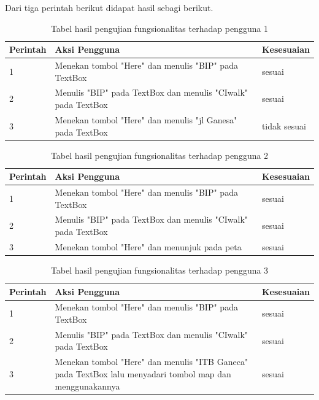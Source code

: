 Dari tiga perintah berikut didapat hasil sebagi berikut.
\begin{table}[h!]
	\centering
		\begin{tabular}{|p{}|p{9cm}|p{2cm}|}\hline
				Perintah & Aksi Pengguna & Kesesuaian \\ \hline
				1 & Menekan tombol "Here" dan menulis "BIP" pada TextBox & sesuai \\ \hline
				2 & Menulis "BIP" pada TextBox dan menulis "CIwalk" pada TextBox & sesuai \\ \hline
				3 & Menekan tombol "Here" dan menulis "jl Ganesa" pada TextBox & tidak sesuai \\ \hline
		\end{tabular}
	\caption{Tabel hasil pengujian fungsionalitas terhadap pengguna 1}
	\label{tab:TabelHasilPengujianFungsionalitasTerhadapPengguna}
\end{table}

\begin{table}[h!]
	\centering
		\begin{tabular}{|p{}|p{9cm}|p{2cm}|}\hline
				Perintah & Aksi Pengguna & Kesesuaian \\ \hline
				1 & Menekan tombol "Here" dan menulis "BIP" pada TextBox & sesuai \\ \hline
				2 & Menulis "BIP" pada TextBox dan menulis "CIwalk" pada TextBox & sesuai \\ \hline
				3 & Menekan tombol "Here" dan menunjuk pada peta & sesuai \\ \hline
		\end{tabular}
	\caption{Tabel hasil pengujian fungsionalitas terhadap pengguna 2}
	\label{tab:TabelHasilPengujianFungsionalitasTerhadapPengguna}
\end{table}

\newpage

\begin{table}[h!]
	\centering
		\begin{tabular}{|p{}|p{9cm}|p{2cm}|}\hline
				Perintah & Aksi Pengguna & Kesesuaian \\ \hline
				1 & Menekan tombol "Here" dan menulis "BIP" pada TextBox & sesuai \\ \hline
				2 & Menulis "BIP" pada TextBox dan menulis "CIwalk" pada TextBox & sesuai \\ \hline
				3 & Menekan tombol "Here" dan menulis "ITB Ganeca" pada TextBox lalu menyadari tombol map dan menggunakannya & sesuai \\ \hline
		\end{tabular}
	\caption{Tabel hasil pengujian fungsionalitas terhadap pengguna 3}
	\label{tab:TabelHasilPengujianFungsionalitasTerhadapPengguna}
\end{table}

